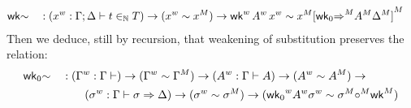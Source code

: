 \begin{alignat*}{5}
  & \mathsf{wk}{\sim} && :
  ({x}^w : \Gamma;\Delta \vdash t\in_{\mathbb{N}} T) \rightarrow
  ({x}^w \sim {x}^M) \rightarrow
  {\mathsf{wk}}^w\,{A}^w\,{x}^w\sim{x}^M{[{\mathsf{wk}_0{\Rightarrow}}^M{A}^M{\Delta}^M]}^M
\end{alignat*}
Then we deduce, still by recursion, that weakening of substitution preserves the
relation:
\begin{alignat*}{5}
  & \mathsf{wk}_0{\sim} && :
  ({\Gamma}^w : \Gamma \vdash) \rightarrow
  ({\Gamma}^w \sim {\Gamma}^M) \rightarrow
  ({A}^w : \Gamma \vdash A) \rightarrow
  ({A}^w \sim {A}^M) \rightarrow
  \\
  &&& \qquad
  ({\sigma}^w : \Gamma\vdash \sigma \Rightarrow \Delta) \rightarrow
  ({\sigma}^w \sim {\sigma}^M) \rightarrow
  ({\mathsf{wk}_0}^w{A}^w{\sigma}^w \sim {\sigma}^M{\circ}^M{\mathsf{wk}}^M)
  \end{alignat*}




